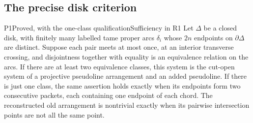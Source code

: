 \subsection{The precise disk criterion}

\begin{resultenv}{P1}{Proved, with the one-class qualification}{Sufficiency in R1}
Let $\Delta$ be a closed disk, with finitely many labelled tame proper
arcs $\delta_i$ whose $2n$ endpoints on $\partial\Delta$ are distinct.
Suppose each pair meets at most once, at an interior transverse
crossing, and disjointness together with equality is an equivalence
relation on the arcs.  If there are at least two equivalence classes,
this system is the cut-open system of a projective pseudoline
arrangement and an added pseudoline.  If there is just one class,
the same assertion holds exactly when its endpoints form two
consecutive packets, each containing one endpoint of each chord.
The reconstructed old arrangement is nontrivial exactly when its
pairwise intersection points are not all the same point.
\end{resultenv}


